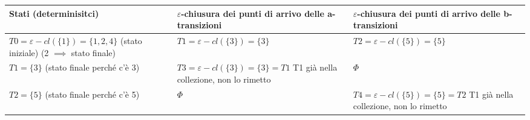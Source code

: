 \documentclass{standalone}
\providecommand\lightrule{%
	\arrayrulecolor{black!30}%
	\midrule[\lightrulewidth]%
	\arrayrulecolor{black}}
\begin{document}
\begin{tabularx}{\textwidth}{XXX}
		Stati (determinisitci) & \(\varepsilon\)-chiusura dei punti di arrivo delle a-transizioni & \(\varepsilon\)-chiusura dei punti di arrivo delle b-transizioni \\
    \midrule
        \(T0 = \varepsilon-cl(\{1\}) = \{1,2,4\}\) \newline
        (stato iniziale) \newline
        (2 \(\implies\) stato finale)
        &
        \(T1 = \varepsilon-cl(\{3\}) = \{3\} \) \newline
        [T1 unmarked]
        &
        \(T2 = \varepsilon-cl(\{5\}) = \{5\}\) \newline 
        [T2 unmarked]
        \\ \lightrule
        \(T1 = \{3\}\) \newline
        (stato finale perché c’è 3)
        &
        \(T3 = \varepsilon-cl(\{3\}) = \{3\} = T1\) \newline
        T1 già nella collezione, non lo rimetto
        &
        \(\Phi\)
        \\ \lightrule
        \(T2 = \{5\}\) \newline
        (stato finale perché c’è 5)
        &
        \(\Phi\)
        &
        \(T4 = \varepsilon-cl(\{5\}) = \{5\} = T2\)
        T1 già nella collezione, non lo rimetto
        \\
\end{tabularx}
\end{document}
